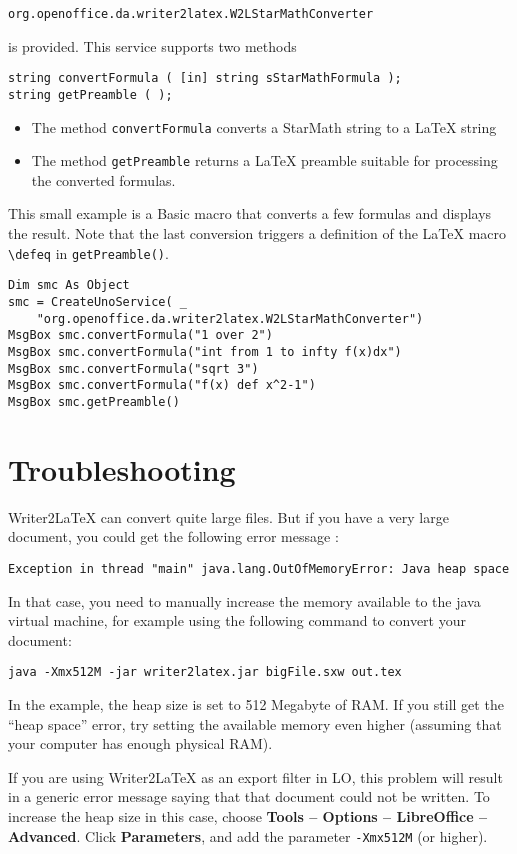 \documentclass{article}
\newcommand\textstyleSourceText[1]{\texttt{\textmd{#1}}}
\newcommand\liststyleLxvii{%
\renewcommand\labelitemi{${\bullet}$}
\renewcommand\labelitemii{${\circ}$}
\renewcommand\labelitemiii{${\blacksquare}$}
\renewcommand\labelitemiv{${\bullet}$}
}
\begin{document}
{\centering
\textstyleSourceText{org.openoffice.da.writer2latex.W2LStarMathConverter}
\par}

{\mdseries
is provided. This service supports two methods}

\begin{verbatim}
string convertFormula ( [in] string sStarMathFormula );
string getPreamble ( );
\end{verbatim}
\liststyleLxvii
\begin{itemize}
\item The method \textstyleSourceText{convertFormula} converts a StarMath string to a LaTeX string
\item The method \textstyleSourceText{getPreamble} returns a LaTeX preamble suitable for processing the converted formulas.
\end{itemize}
{\mdseries
This small example is a Basic macro that converts a few formulas and displays the result. Note that the last conversion triggers a definition of the LaTeX macro \textstyleSourceText{{\textbackslash}defeq} in \textstyleSourceText{getPreamble()}.}

\begin{verbatim}
Dim smc As Object
smc = CreateUnoService( _
    "org.openoffice.da.writer2latex.W2LStarMathConverter")
MsgBox smc.convertFormula("1 over 2")
MsgBox smc.convertFormula("int from 1 to infty f(x)dx")
MsgBox smc.convertFormula("sqrt 3")
MsgBox smc.convertFormula("f(x) def x^2-1")
MsgBox smc.getPreamble()
\end{verbatim}
\section{Troubleshooting}
Writer2LaTeX can convert quite large files. But if you have a very large document, you could get the following error message : 

\begin{verbatim}
Exception in thread "main" java.lang.OutOfMemoryError: Java heap space
\end{verbatim}
{\mdseries
In that case, you need to manually increase the memory available to the java virtual machine, for example using the following command to convert your document:}

\begin{verbatim}
java -Xmx512M -jar writer2latex.jar bigFile.sxw out.tex
\end{verbatim}
{\mdseries
In the example, the heap size is set to 512 Megabyte of RAM. If you still get the ``heap space'' error,  try setting the available memory even higher (assuming that your computer has enough physical RAM).}

{\mdseries
If you are using Writer2LaTeX as an export filter in LO, this problem will result in a generic error message saying that that document could not be written. To increase the heap size in this case, choose \textbf{Tools -- Options -- LibreOffice -- Advanced}. Click \textbf{Parameters}, and add the parameter \textstyleSourceText{{}-Xmx512M} (or higher).}
\end{document}

